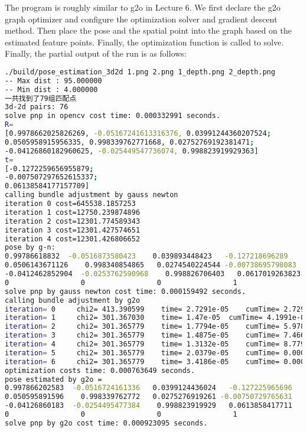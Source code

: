 The program is roughly similar to g2o in Lecture 6. We first declare the g2o graph optimizer and configure the optimization solver and gradient descent method. Then place the pose and the spatial point into the graph based on the estimated feature points. Finally, the optimization function is called to solve. Finally, the partial output of the run is as follows:
\begin{lstlisting}[language=sh,caption=终端输入：]
./build/pose_estimation_3d2d 1.png 2.png 1_depth.png 2_depth.png
-- Max dist : 95.000000 
-- Min dist : 4.000000 
一共找到了79组匹配点
3d-2d pairs: 76
solve pnp in opencv cost time: 0.000332991 seconds.
R=
[0.9978662025826269, -0.05167241613316376, 0.03991244360207524;
0.0505958915956335, 0.998339762771668, 0.02752769192381471;
-0.04126860182960625, -0.025449547736074, 0.998823919929363]
t=
[-0.1272259656955879;
-0.007507297652615337;
0.06138584177157709]
calling bundle adjustment by gauss newton
iteration 0 cost=645538.1857253
iteration 1 cost=12750.239874896
iteration 2 cost=12301.774589343
iteration 3 cost=12301.427574651
iteration 4 cost=12301.426806652
pose by g-n: 
0.99786618832  -0.0516873580423    0.039893448423   -0.127218696289
0.0506143671126    0.998340854865   0.0274540224544 -0.00738695798083
-0.0412462852904  -0.0253762590968    0.998826706403   0.0617019263823
0                 0                 0                 1
solve pnp by gauss newton cost time: 0.000159492 seconds.
calling bundle adjustment by g2o
iteration= 0	 chi2= 413.390599	 time= 2.7291e-05	 cumTime= 2.7291e-05	 edges= 76	 schur= 0	 lambda= 79.000412	 levenbergIter= 1
iteration= 1	 chi2= 301.367030	 time= 1.47e-05	 cumTime= 4.1991e-05	 edges= 76	 schur= 0	 lambda= 26.333471	 levenbergIter= 1
iteration= 2	 chi2= 301.365779	 time= 1.7794e-05	 cumTime= 5.9785e-05	 edges= 76	 schur= 0	 lambda= 17.555647	 levenbergIter= 1
iteration= 3	 chi2= 301.365779	 time= 1.4875e-05	 cumTime= 7.466e-05	 edges= 76	 schur= 0	 lambda= 11.703765	 levenbergIter= 1
iteration= 4	 chi2= 301.365779	 time= 1.3132e-05	 cumTime= 8.7792e-05	 edges= 76	 schur= 0	 lambda= 7.802510	 levenbergIter= 1
iteration= 5	 chi2= 301.365779	 time= 2.0379e-05	 cumTime= 0.000108171	 edges= 76	 schur= 0	 lambda= 41.613386	 levenbergIter= 3
iteration= 6	 chi2= 301.365779	 time= 3.4186e-05	 cumTime= 0.000142357	 edges= 76	 schur= 0	 lambda= 2859650082279.672363	 levenbergIter= 8
optimization costs time: 0.000763649 seconds.
pose estimated by g2o =
0.997866202583  -0.0516724161336   0.0399124436024   -0.127225965696
0.050595891596    0.998339762772   0.0275276919261 -0.00750729765631
-0.04126860183  -0.0254495477384    0.998823919929   0.0613858417711
0                 0                 0                 1
solve pnp by g2o cost time: 0.000923095 seconds.
\end{lstlisting}

